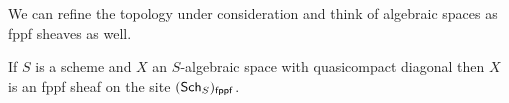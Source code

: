 We can refine the topology under consideration and think of algebraic spaces as fppf sheaves as well. 
\begin{theorem}\label{thm: spaces are fppf sheaves}
    If $S$ is a scheme and $X$ an $S$-algebraic space with quasicompact diagonal then $X$ is an fppf sheaf on the site $(\mathsf{Sch}_{S})_{\mathsf{fppf}}$.
\end{theorem}
